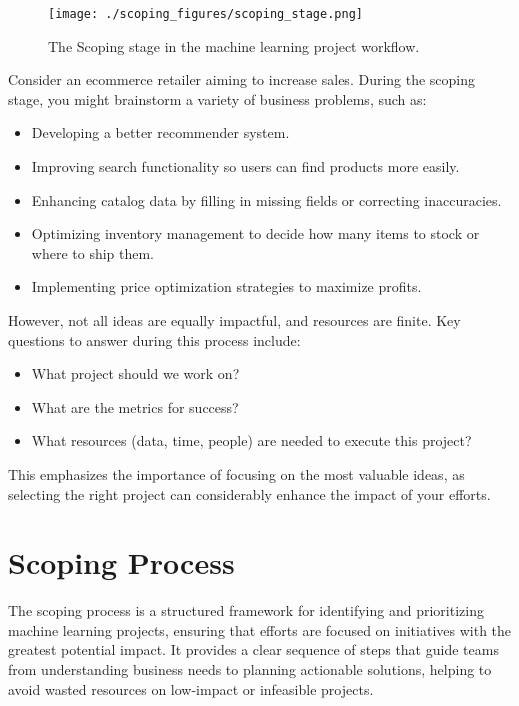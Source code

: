 \documentclass[12pt,openany, draft]{book}
\begin{document}
\begin{figure}[htbp]
    \centering
    \texttt{[image: ./scoping\_figures/scoping\_stage.png]}
    \caption{The Scoping stage in the machine learning project workflow.}
    \label{fig:scoping_stage}
\end{figure}

\begin{examplebox}
Consider an ecommerce retailer aiming to increase sales. During the scoping stage, you might brainstorm a variety of business problems, such as:
\begin{itemize}
    \item Developing a better recommender system.
    \item Improving search functionality so users can find products more easily.
    \item Enhancing catalog data by filling in missing fields or correcting inaccuracies.
    \item Optimizing inventory management to decide how many items to stock or where to ship them.
    \item Implementing price optimization strategies to maximize profits.
\end{itemize}
However, not all ideas are equally impactful, and resources are finite. Key questions to answer during this process include:
\begin{itemize}
    \item What project should we work on?
    \item What are the metrics for success?
    \item What resources (data, time, people) are needed to execute this project?
\end{itemize}
This emphasizes the importance of focusing on the most valuable ideas, as selecting the right project can considerably enhance the impact of your efforts.
\end{examplebox}

\chapter{Scoping Process}

The scoping process is a structured framework for identifying and prioritizing machine learning projects, ensuring that efforts are focused on initiatives with the greatest potential impact. It provides a clear sequence of steps that guide teams from understanding business needs to planning actionable solutions, helping to avoid wasted resources on low-impact or infeasible projects. \newline
\end{document}
